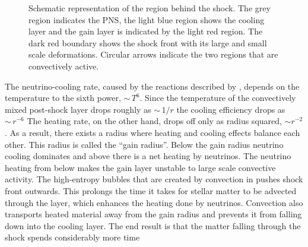 \begin{figure}
\begin{center}
\end{center}
\caption{Schematic representation of the region behind the shock. The grey region indicates the PNS, the light blue
region shows the cooling layer and the gain layer is indicated by the light red region. The dark red boundary shows the shock
front with its large and small scale deformations. Circular arrows indicate the two regions that are convectively active. }
\label{figSN:post}
\end{figure}
The neutrino-cooling rate, caused by the reactions described by , depends on the temperature to the sixth power, $\sim \, T^6$. 
Since the temperature of the convectively mixed 
post-shock layer drops roughly as $\sim \, 1/r$ \citep{janka_12} the cooling efficiency drops as $\sim \, r^{-6}$  
The heating rate, on the other hand, drops off only as radius squared, $\sim r^{-2}$.     
As a result, there exists a radius where heating and cooling effects balance each other.
This radius is called the ``gain radius''. Below the gain radius neutrino cooling dominates
and above there is a net heating by neutrinos. The neutrino heating from below makes the gain layer unstable to
large scale convective activity. The high-entropy bubbles that are created by convection in
pushes shock front outwards. This prolongs the time it takes for stellar matter to be advected through the layer, which enhances the heating done by neutrinos. 
Convection also transports heated material away from the gain radius and prevents it from falling down into
the cooling layer. The end result is that the matter falling through the shock spends considerably more time

